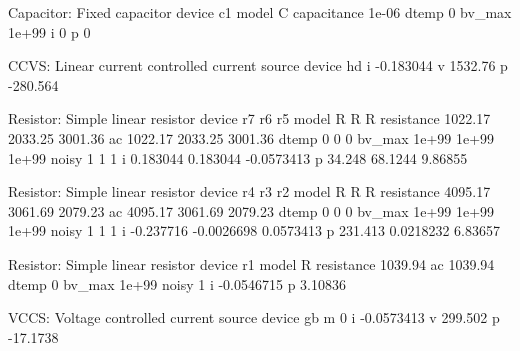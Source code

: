  Capacitor: Fixed capacitor
     device                    c1
      model                     C
capacitance                 1e-06
      dtemp                     0
     bv_max                 1e+99
          i                     0
          p                     0

 CCVS: Linear current controlled current source
     device                    hd
          i             -0.183044
          v               1532.76
          p              -280.564

 Resistor: Simple linear resistor
     device                    r7                    r6                    r5
      model                     R                     R                     R
 resistance               1022.17               2033.25               3001.36
         ac               1022.17               2033.25               3001.36
      dtemp                     0                     0                     0
     bv_max                 1e+99                 1e+99                 1e+99
      noisy                     1                     1                     1
          i              0.183044              0.183044            -0.0573413
          p                34.248               68.1244               9.86855

 Resistor: Simple linear resistor
     device                    r4                    r3                    r2
      model                     R                     R                     R
 resistance               4095.17               3061.69               2079.23
         ac               4095.17               3061.69               2079.23
      dtemp                     0                     0                     0
     bv_max                 1e+99                 1e+99                 1e+99
      noisy                     1                     1                     1
          i             -0.237716            -0.0026698             0.0573413
          p               231.413             0.0218232               6.83657

 Resistor: Simple linear resistor
     device                    r1
      model                     R
 resistance               1039.94
         ac               1039.94
      dtemp                     0
     bv_max                 1e+99
      noisy                     1
          i            -0.0546715
          p               3.10836

 VCCS: Voltage controlled current source
     device                    gb
          m                     0
          i            -0.0573413
          v               299.502
          p              -17.1738

